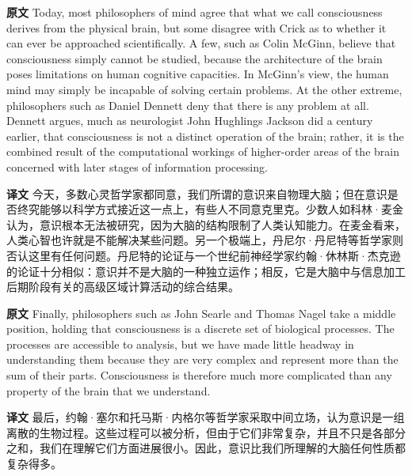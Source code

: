 \documentclass[UTF8]{ctexart}
\newenvironment{english}{\par\small\noindent\textbf{原文}\quad\ignorespaces}{\par}
\newenvironment{zhtranslation}{\par\noindent\textbf{译文}\quad\ignorespaces}{\par\vspace{0.35em}}
\begin{document}
\begin{english}
Today, most philosophers of mind agree that what we call consciousness derives from the physical brain, but some disagree with Crick as to whether it can ever be approached scientifically. A few, such as Colin McGinn, believe that consciousness simply cannot be studied, because the architecture of the brain poses limitations on human cognitive capacities. In McGinn's view, the human mind may simply be incapable of solving certain problems. At the other extreme, philosophers such as Daniel Dennett deny that there is any problem at all. Dennett argues, much as neurologist John Hughlings Jackson did a century earlier, that consciousness is not a distinct operation of the brain; rather, it is the combined result of the computational workings of higher-order areas of the brain concerned with later stages of information processing.
\end{english}
\begin{zhtranslation}
今天，多数心灵哲学家都同意，我们所谓的意识来自物理大脑；但在意识是否终究能够以科学方式接近这一点上，有些人不同意克里克。少数人如科林·麦金认为，意识根本无法被研究，因为大脑的结构限制了人类认知能力。在麦金看来，人类心智也许就是不能解决某些问题。另一个极端上，丹尼尔·丹尼特等哲学家则否认这里有任何问题。丹尼特的论证与一个世纪前神经学家约翰·休林斯·杰克逊的论证十分相似：意识并不是大脑的一种独立运作；相反，它是大脑中与信息加工后期阶段有关的高级区域计算活动的综合结果。\end{zhtranslation}

\begin{english}
Finally, philosophers such as John Searle and Thomas Nagel take a middle position, holding that consciousness is a discrete set of biological processes. The processes are accessible to analysis, but we have made little headway in understanding them because they are very complex and represent more than the sum of their parts. Consciousness is therefore much more complicated than any property of the brain that we understand.
\end{english}
\begin{zhtranslation}
最后，约翰·塞尔和托马斯·内格尔等哲学家采取中间立场，认为意识是一组离散的生物过程。这些过程可以被分析，但由于它们非常复杂，并且不只是各部分之和，我们在理解它们方面进展很小。因此，意识比我们所理解的大脑任何性质都复杂得多。\end{zhtranslation}
\end{document}

